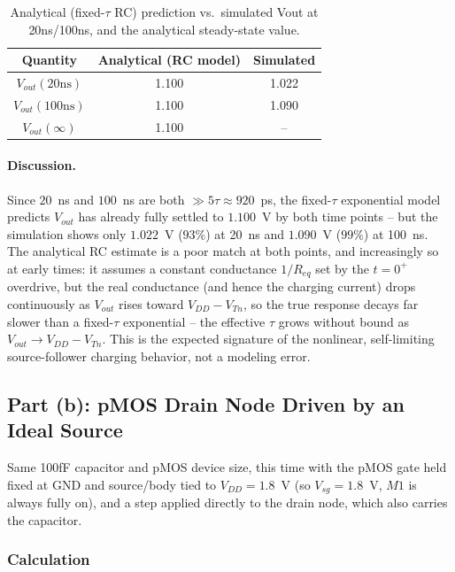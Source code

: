 \begin{table}[h]
  \centering
  \begin{tabular}{|c|c|c|}
    \hline
    Quantity & Analytical (RC model) & Simulated \\
    \hline
    $V_{out}(20\text{ns})$  & 1.100 & 1.022 \\
    $V_{out}(100\text{ns})$ & 1.100 & 1.090 \\
    $V_{out}(\infty)$       & 1.100 & -- \\
    \hline
  \end{tabular}
  \caption{Analytical (fixed-$\tau$ RC) prediction vs.\ simulated Vout at 20ns/100ns, and the analytical steady-state value.}
\end{table}

\paragraph{Discussion.} Since $20$~ns and $100$~ns are both $\gg 5\tau\approx920$~ps, the fixed-$\tau$ exponential model predicts $V_{out}$ has already fully settled to $1.100$~V by both time points -- but the simulation shows only $1.022$~V ($93\%$) at 20~ns and $1.090$~V ($99\%$) at 100~ns. The analytical RC estimate is a poor match at both points, and increasingly so at early times: it assumes a constant conductance $1/R_{eq}$ set by the $t=0^+$ overdrive, but the real conductance (and hence the charging current) drops continuously as $V_{out}$ rises toward $V_{DD}-V_{Tn}$, so the true response decays far slower than a fixed-$\tau$ exponential -- the effective $\tau$ grows without bound as $V_{out}\to V_{DD}-V_{Tn}$. This is the expected signature of the nonlinear, self-limiting source-follower charging behavior, not a modeling error.

\subsection{Part (b): pMOS Drain Node Driven by an Ideal Source}

Same 100fF capacitor and pMOS device size, this time with the pMOS gate held fixed at GND and source/body tied to $V_{DD}=1.8$~V (so $V_{sg}=1.8$~V, $M1$ is always fully on), and a step applied directly to the drain node, which also carries the capacitor.

\subsubsection{Calculation}

